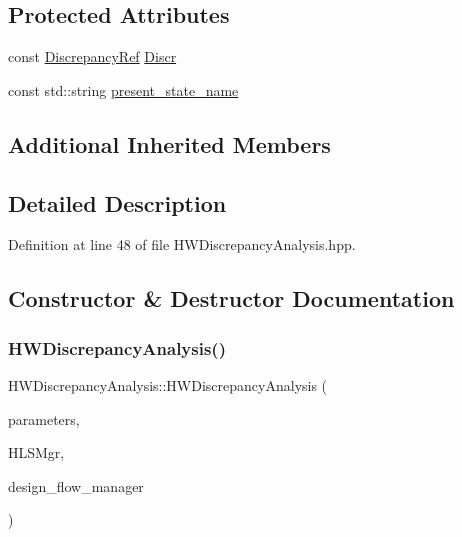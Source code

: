 \subsection*{Protected Attributes}
\begin{DoxyCompactItemize}
\item 
const \hyperlink{Discrepancy_8hpp_a9fb5a8938b4eeaafdaf7707f583f0193}{Discrepancy\+Ref} \hyperlink{classHWDiscrepancyAnalysis_a90a94fe5a395ef66486bd8f28aa85b49}{Discr}
\item 
const std\+::string \hyperlink{classHWDiscrepancyAnalysis_a6ccd9680ea771b8f16195cb8ed5119e8}{present\+\_\+state\+\_\+name}
\end{DoxyCompactItemize}
\subsection*{Additional Inherited Members}


\subsection{Detailed Description}


Definition at line 48 of file H\+W\+Discrepancy\+Analysis.\+hpp.



\subsection{Constructor \& Destructor Documentation}
\mbox{\label{classHWDiscrepancyAnalysis_ad14caf48e75bc3e791150c6d9efeee7a}} 
\subsubsection{\texorpdfstring{H\+W\+Discrepancy\+Analysis()}{HWDiscrepancyAnalysis()}}
{\footnotesize\ttfamily H\+W\+Discrepancy\+Analysis\+::\+H\+W\+Discrepancy\+Analysis (\begin{DoxyParamCaption}\item[{const \hyperlink{Parameter_8hpp_a37841774a6fcb479b597fdf8955eb4ea}{Parameter\+Const\+Ref}}]{parameters,  }\item[{const \hyperlink{hls__manager_8hpp_acd3842b8589fe52c08fc0b2fcc813bfe}{H\+L\+S\+\_\+manager\+Ref}}]{H\+L\+S\+Mgr,  }\item[{const Design\+Flow\+Manager\+Const\+Ref}]{design\+\_\+flow\+\_\+manager }\end{DoxyParamCaption})}



